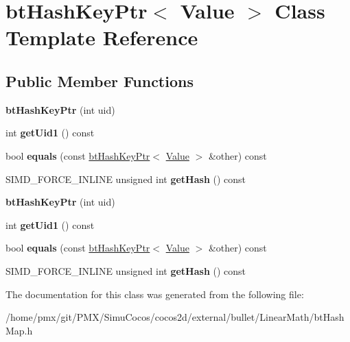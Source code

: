 \hypertarget{classbtHashKeyPtr}{}\section{bt\+Hash\+Key\+Ptr$<$ Value $>$ Class Template Reference}
\label{classbtHashKeyPtr}
\subsection*{Public Member Functions}
\begin{DoxyCompactItemize}
\item 
\mbox{\label{classbtHashKeyPtr_ab33ccbffefbfd7e7e055d1661cd8b684}} 
{\bfseries bt\+Hash\+Key\+Ptr} (int uid)
\item 
\mbox{\label{classbtHashKeyPtr_ad50bff9ed17cf60b9ecaf5ca2c0a0368}} 
int {\bfseries get\+Uid1} () const
\item 
\mbox{\label{classbtHashKeyPtr_abcb16d66e38de6e1bc69ab47cd0bca11}} 
bool {\bfseries equals} (const \hyperlink{classbtHashKeyPtr}{bt\+Hash\+Key\+Ptr}$<$ \hyperlink{classValue}{Value} $>$ \&other) const
\item 
\mbox{\label{classbtHashKeyPtr_a8009123704d2da640f5d3cac768f365f}} 
S\+I\+M\+D\+\_\+\+F\+O\+R\+C\+E\+\_\+\+I\+N\+L\+I\+NE unsigned int {\bfseries get\+Hash} () const
\item 
\mbox{\label{classbtHashKeyPtr_ab33ccbffefbfd7e7e055d1661cd8b684}} 
{\bfseries bt\+Hash\+Key\+Ptr} (int uid)
\item 
\mbox{\label{classbtHashKeyPtr_ad50bff9ed17cf60b9ecaf5ca2c0a0368}} 
int {\bfseries get\+Uid1} () const
\item 
\mbox{\label{classbtHashKeyPtr_abcb16d66e38de6e1bc69ab47cd0bca11}} 
bool {\bfseries equals} (const \hyperlink{classbtHashKeyPtr}{bt\+Hash\+Key\+Ptr}$<$ \hyperlink{classValue}{Value} $>$ \&other) const
\item 
\mbox{\label{classbtHashKeyPtr_a8009123704d2da640f5d3cac768f365f}} 
S\+I\+M\+D\+\_\+\+F\+O\+R\+C\+E\+\_\+\+I\+N\+L\+I\+NE unsigned int {\bfseries get\+Hash} () const
\end{DoxyCompactItemize}


The documentation for this class was generated from the following file\+:\begin{DoxyCompactItemize}
\item 
/home/pmx/git/\+P\+M\+X/\+Simu\+Cocos/cocos2d/external/bullet/\+Linear\+Math/bt\+Hash\+Map.\+h\end{DoxyCompactItemize}
